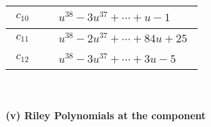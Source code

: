 \documentclass[1p]{elsarticle_modified}
\theoremstyle{definition}
\begin{document}
\begin{tabular}{m{50pt}|m{274pt}}
\hline $$\begin{aligned}c_{10}\end{aligned}$$&$\begin{aligned}
&u^{38}-3 u^{37}+\cdots+u-1
\end{aligned}$\\
\hline $$\begin{aligned}c_{11}\end{aligned}$$&$\begin{aligned}
&u^{38}-2 u^{37}+\cdots+84 u+25
\end{aligned}$\\
\hline $$\begin{aligned}c_{12}\end{aligned}$$&$\begin{aligned}
&u^{38}-3 u^{37}+\cdots+3 u-5
\end{aligned}$\\
\hline
\end{tabular}\\~\\
\newpage\renewcommand{\arraystretch}{1}
\flushleft \textbf{(v) Riley Polynomials at the component}\newline \\
\end{document}
